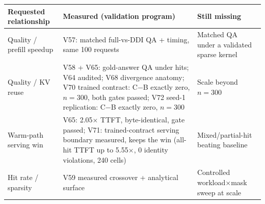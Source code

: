 \begin{tabular}{@{}p{4.3cm}p{5.4cm}p{5.4cm}@{}}
\toprule
\textbf{Requested relationship} & \textbf{Measured (validation program)} &
\textbf{Still missing} \\
\midrule
Quality / prefill speedup & \textcolor{ddiBlue}{V57: matched full-vs-DDI QA + timing, same 100 requests} &
\textcolor{ddiRed}{Matched QA under a validated sparse kernel} \\[5pt]
Quality / KV reuse & \textcolor{ddiGreen}{V58 + V65: gold-answer QA under hits; V64 audited;
V68 divergence anatomy; V70 trained contract: C$-$B exactly zero, $n{=}300$, both gates passed;
V72 seed-1 replication: C$-$B exactly zero, $n{=}300$} &
\textcolor{ddiRed}{Scale beyond $n{=}300$} \\[5pt]
Warm-path serving win & \textcolor{ddiGreen}{V65: 2.05$\times$ TTFT, byte-identical, gate passed;
V71: trained-contract serving boundary measured, keeps the win (all-hit TTFT up to 5.55$\times$, 0 identity violations, 240 cells)} &
\textcolor{ddiRed}{Mixed/partial-hit beating baseline} \\[5pt]
Hit rate / sparsity & \textcolor{ddiPurple}{V59 measured crossover + analytical surface} &
\textcolor{ddiRed}{Controlled workload$\times$mask sweep at scale} \\
\bottomrule
\end{tabular}
